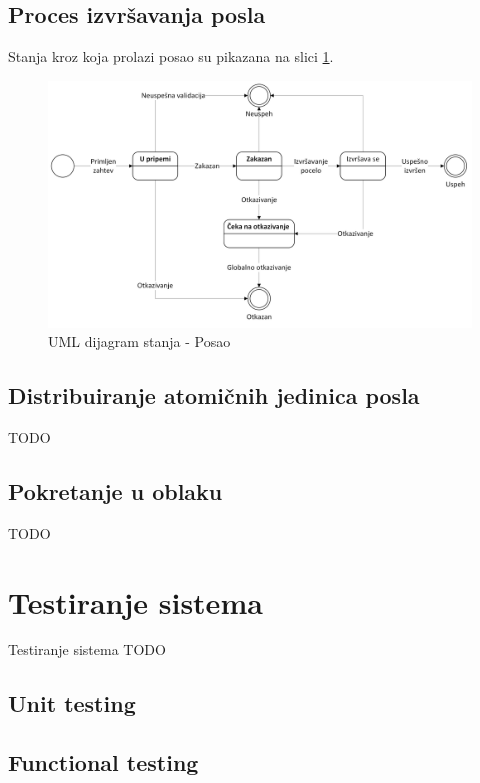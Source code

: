 \documentclass[12pt,oneside]{memoir}
\begin{document}
\section{Proces izvršavanja posla}
Stanja kroz koja prolazi posao su pikazana na slici \ref{fig:stanjaposla}.

\begin{figure}[!ht]
  \centering
  \label{fig:stanjaposla}
  \includegraphics[width=1.0\textwidth]{./images/dijagram_stanja_posao.png}
  \caption{UML dijagram stanja - Posao}
\end{figure}


\section{Distribuiranje atomičnih jedinica posla}
TODO

\section{Pokretanje u oblaku}
TODO

\chapter{Testiranje sistema}
\label{chp:testiranjesistema}

Testiranje sistema TODO

\section{Unit testing}

\section{Functional testing}
\end{document}
